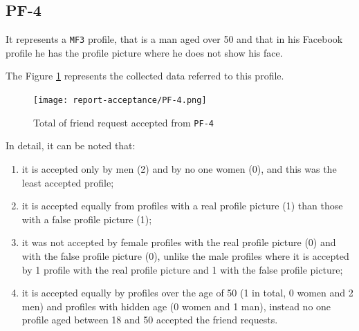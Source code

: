 \subsection*{PF-4}
It represents a \texttt{MF3} profile, that is a man aged over 50 and that in his Facebook profile he has the profile picture where he does not show his face.
\par \noindent The Figure \ref{fig:accepted-from-PF4} represents the collected data referred to this profile.
\begin{figure}[H]	
	\centering
	\texttt{[image: report-acceptance/PF-4.png]} 
	\caption{Total of friend request accepted from \texttt{PF-4}}
	\label{fig:accepted-from-PF4}
\end{figure}
\par \noindent In detail, it can be noted that:
\begin{enumerate}
	\item it is accepted only by men (2) and by no one women (0), and this was the least accepted profile;
	\item it is accepted equally from profiles with a real profile picture (1) than those with a false profile picture (1);
	\item it was not accepted by female profiles with the real profile picture (0) and with the false profile picture (0), unlike the male profiles where it is accepted by 1 profile with the real profile picture and 1 with the false profile picture;
	\item it is accepted equally by profiles over the age of 50 (1 in total, 0 women and 2 men) and profiles with hidden age (0 women and 1 man), instead no one profile aged between 18 and 50 accepted the friend requests.
\end{enumerate}



